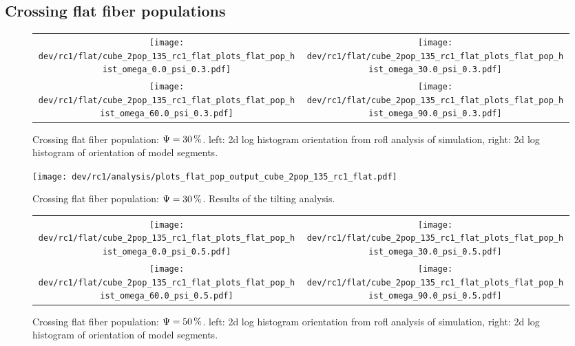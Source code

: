 \subsection{Crossing flat fiber populations}
\label{sec:resCrossFlat}
% 
\begin{figure}[!t]
\centering
\setlength{\width}{0.45\textwidth}
\begin{tabular}{c|c}
    \texttt{[image: dev/rc1/flat/cube\_2pop\_135\_rc1\_flat\_plots\_flat\_pop\_hist\_omega\_0.0\_psi\_0.3.pdf]} &
    \texttt{[image: dev/rc1/flat/cube\_2pop\_135\_rc1\_flat\_plots\_flat\_pop\_hist\_omega\_30.0\_psi\_0.3.pdf]} \\ \texttt{[image: dev/rc1/flat/cube\_2pop\_135\_rc1\_flat\_plots\_flat\_pop\_hist\_omega\_60.0\_psi\_0.3.pdf]} & \texttt{[image: dev/rc1/flat/cube\_2pop\_135\_rc1\_flat\_plots\_flat\_pop\_hist\_omega\_90.0\_psi\_0.3.pdf]}
\end{tabular}
\caption[sim]{Crossing flat fiber population: $\textnormal{$\Psi$}=\SI{30}{\percent}$. left: 2d log histogram orientation from rofl analysis of simulation, right: 2d log histogram of orientation of model segments. }
\label{fig:flat_03_fiber_pop_hist}
\end{figure}
% 
\begin{figure}[!p]
\centering
\texttt{[image: dev/rc1/analysis/plots\_flat\_pop\_output\_cube\_2pop\_135\_rc1\_flat.pdf]}
\caption[]{Crossing flat fiber population: $\textnormal{$\Psi$}=\SI{30}{\percent}$. Results of the tilting analysis.}
\label{fig:flat_03_fiber_pop_rofl}
\end{figure}
% 
\begin{figure}[!t]
\centering
\setlength{\width}{0.4\textwidth}
\begin{tabular}{c|c}
    \texttt{[image: dev/rc1/flat/cube\_2pop\_135\_rc1\_flat\_plots\_flat\_pop\_hist\_omega\_0.0\_psi\_0.5.pdf]} &
    \texttt{[image: dev/rc1/flat/cube\_2pop\_135\_rc1\_flat\_plots\_flat\_pop\_hist\_omega\_30.0\_psi\_0.5.pdf]} \\
    \texttt{[image: dev/rc1/flat/cube\_2pop\_135\_rc1\_flat\_plots\_flat\_pop\_hist\_omega\_60.0\_psi\_0.5.pdf]} &
    \texttt{[image: dev/rc1/flat/cube\_2pop\_135\_rc1\_flat\_plots\_flat\_pop\_hist\_omega\_90.0\_psi\_0.5.pdf]}
\end{tabular}
\caption[sim]{Crossing flat fiber population: $\textnormal{$\Psi$}=\SI{50}{\percent}$. left: 2d log histogram orientation from rofl analysis of simulation, right: 2d log histogram of orientation of model segments. }
\label{fig:flat_05_fiber_pop_hist}
\end{figure}
